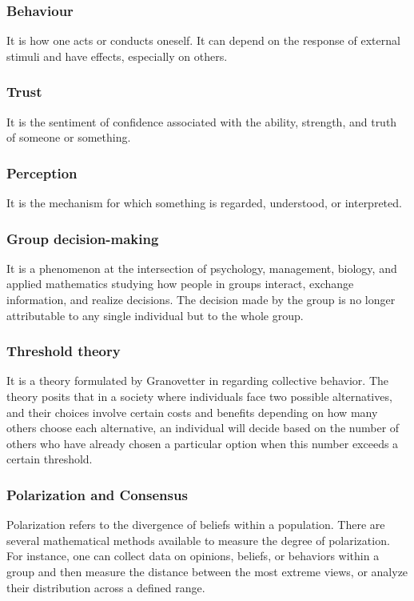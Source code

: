 \subsubsection{Behaviour} It is how one acts or conducts oneself. It can depend on the response of external stimuli and have effects, especially on others.
\subsubsection{Trust} It is the sentiment of confidence associated with the ability, strength, and truth of someone or something. 

\subsubsection{Perception} It is the mechanism for which something is regarded, understood, or interpreted.

\subsubsection{Group decision-making} It is a phenomenon at the intersection of psychology, management, biology, and applied mathematics studying how people in groups interact, exchange information, and realize decisions. The decision made by the group is no longer attributable to any single individual but to the whole group. 
 
\subsubsection{Threshold theory}

It is a theory formulated by Granovetter in \cite{Granovetter_1978} regarding collective behavior. The theory posits that in a society where individuals face two possible alternatives, and their choices involve certain costs and benefits depending on how many others choose each alternative, an individual will decide based on the number of others who have already chosen a particular option when this number exceeds a certain threshold.

\subsubsection{Polarization and Consensus}

Polarization refers to the divergence of beliefs within a population. There are several mathematical methods available to measure the degree of polarization. For instance, one can collect data on opinions, beliefs, or behaviors within a group and then measure the distance between the most extreme views, or analyze their distribution across a defined range.

